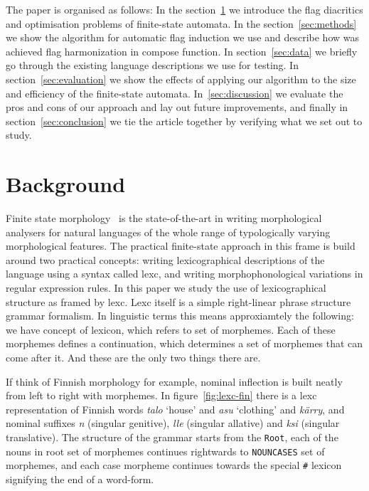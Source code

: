 \documentclass[11pt]{article}
\begin{document}
The paper is organised as follows: In the section~\ref{sec:background} we
introduce the flag diacritics and optimisation problems of finite-state 
automata. In the section~\ref{sec:methods} we show the algorithm for automatic
flag induction we use and describe how was achieved flag harmonization in compose function. 
In section~\ref{sec:data} we briefly go through the existing language
descriptions we use for testing. In 
section~\ref{sec:evaluation} we show the effects of applying our algorithm
to the size and efficiency of the finite-state automata. In~\ref{sec:discussion}
we evaluate the pros and cons of our approach and lay out future improvements,
and finally in section~\ref{sec:conclusion} we tie the article together by
verifying what we set out to study.

\section{Background}
\label{sec:background}

Finite state morphology~\cite{beesley2003finite} is the state-of-the-art in
writing morphological analysers for natural languages of the whole range of
typologically varying morphological features. The practical finite-state
approach in this frame is build around two practical concepts: writing
lexicographical descriptions of the language using a syntax called lexc, and
writing morphophonological variations in regular expression rules. In this
paper we study the use of lexicographical structure as framed by lexc. Lexc
itself is a simple right-linear phrase structure grammar formalism. In
linguistic terms this means approxiamtely the following: we have concept of
lexicon, which refers to set of morphemes. Each of these morphemes defines a
continuation, which determines a set of morphemes that can come after it. And
these are the only two things there are. 

If think of Finnish morphology for example, nominal inflection is built neatly
from left to right with morphemes. In figure~\ref{fig:lexc-fin} there is a 
lexc representation of Finnish words \emph{talo} `house' and \emph{asu}
`clothing' and \emph{kärry}, and nominal suffixes \emph{n} (singular genitive),
\emph{lle} (singular allative) and \emph{ksi} (singular translative). The
structure of the grammar starts from the \texttt{Root}, each of the nouns in
root set of morphemes continues rightwards to \texttt{NOUNCASES} set of 
morphemes, and each case morpheme continues towards the special \texttt{\#}
lexicon signifying the end of a word-form.
\end{document}
